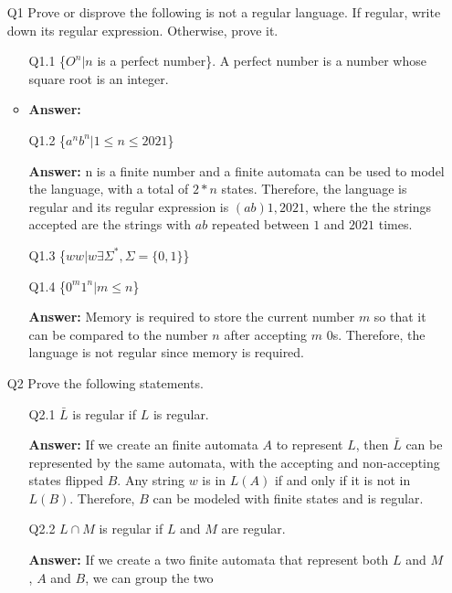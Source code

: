 \documentclass[12pt]{article}
\begin{document}
\begin{itemize}
    \item[Q1] Prove or disprove the following is not a regular language. If
        regular, write down its regular expression. Otherwise, prove it.
        \begin{itemize}
            \item[Q1.1] \{$O^n|n$ is a perfect number\}. A perfect number is a
                number whose square root is an integer.
            \item{\textbf{Answer:}} 
            \item[Q1.2] \{$a^nb^n|1 \leq n \leq 2021$\}
            \item[\textbf{Answer:}] n is a finite number and a finite automata
                can be used to model the language, with a total of $2*n$ states.
                Therefore, the language is regular and its regular expression is
                $(ab){1,2021}$, where the the strings accepted are the strings
                with $ab$ repeated between $1$ and $2021$ times.
            \item[Q1.3] \{$ww|w \exists \Sigma^*, \Sigma=\{0,1\}$\}
            \item[Q1.4] \{$0^m1^n| m \leq n$\}
            \item[\textbf{Answer:}] Memory is required to store the current
            number $m$ so that it can be compared to the number $n$ after
            accepting $m$ $0$s. Therefore, the language is not regular since
            memory is required.
        \end{itemize}
    \item[Q2] Prove the following statements.
        \begin{itemize}
            \item[Q2.1] $\bar L$ is regular if $L$ is regular.
            \item[\textbf{Answer:}] If we create an finite automata $A$ to
                represent $L$, then $\bar L$ can be represented by the same
                automata, with the accepting and non-accepting states flipped
                $B$. Any string $w$ is in $L(A)$ if and only if it is not in
                $L(B)$. Therefore, $B$ can be modeled with finite states and is
                regular.
            \item[Q2.2] $L \cap M$ is regular if $L$ and $M$ are regular.
            \item[\textbf{Answer:}] If we create a two finite automata that
                represent both $L$ and $M$, $A$ and $B$, we can group the two

\end{itemize}
\end{itemize}
\end{document}
